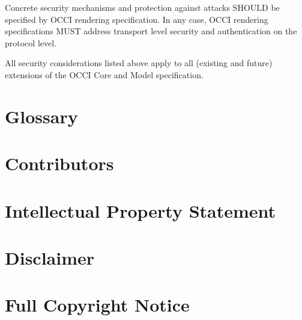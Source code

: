 \documentclass[10pt,a4paper]{article}
\begin{document}
Concrete security mechanisms and protection against attacks SHOULD be specified
by OCCI rendering specification. In any case, OCCI rendering specifications MUST
address transport level security and authentication on the protocol level.

All security considerations listed above apply to all (existing and future)
extensions of the OCCI Core and Model specification.

\section{Glossary}
\label{sec:glossary}


\section{Contributors}


\section{Intellectual Property Statement}


\section{Disclaimer}


\section{Full Copyright Notice}




\end{document}
